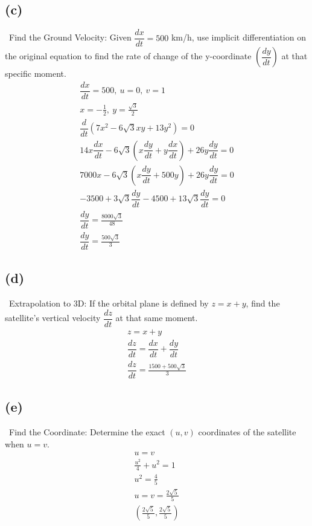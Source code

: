 \documentclass[12pt]{article}
\begin{document}
\subsection{(c)} \, Find the Ground Velocity: Given $\dfrac{dx}{dt}=500$ km/h, use implicit differentiation on the original equation to find the rate of change of the y-coordinate $(\dfrac{dy}{dt})$ at that specific moment.
\begin{gather*}
    \dfrac{dx}{dt}=500,\ u=0,\ v=1\\
    x= -\frac{1}{2}, \ y= \frac{\sqrt{3}}{2}\\
    \dfrac{d}{dt}(7x^2-6\sqrt{3}xy+13y^2)=0\\
    14x\dfrac{dx}{dt}-6\sqrt{3}(x\dfrac{dy}{dt}+y\dfrac{dx}{dt})+26y\dfrac{dy}{dt}=0\\
    7000x-6\sqrt{3}(x\dfrac{dy}{dt}+500y)+26y\dfrac{dy}{dt}=0\\
    -3500+3\sqrt{3}\dfrac{dy}{dt}-4500+13\sqrt{3}\dfrac{dy}{dt}=0\\
    \dfrac{dy}{dt}=\frac{8000\sqrt{3}}{48}\\
    \boxed{\dfrac{dy}{dt}=\frac{500\sqrt{3}}{3}}
\end{gather*}

\subsection{(d)} \, Extrapolation to 3D: If the orbital plane is defined by $z=x+y$, find the satellite's vertical velocity $\dfrac{dz}{dt}$ at that same moment.
\begin{gather*}
    z=x+y\\
    \dfrac{dz}{dt}=\dfrac{dx}{dt}+\dfrac{dy}{dt}\\
    \boxed{\dfrac{dz}{dt}=\frac{1500+500\sqrt{3}}{3}}    
\end{gather*}

\subsection{(e)} \, Find the Coordinate: Determine the exact $(u,v)$ coordinates of the satellite when $u=v$.
\begin{gather*}
    u=v\\
    \frac{u^2}{4}+u^2=1\\
    u^2=\frac{4}{5}\\
    u=v=\frac{2\sqrt{5}}{5}\\
    \boxed{(\frac{2\sqrt{5}}{5},\frac{2\sqrt{5}}{5})}
\end{gather*}
\end{document}

